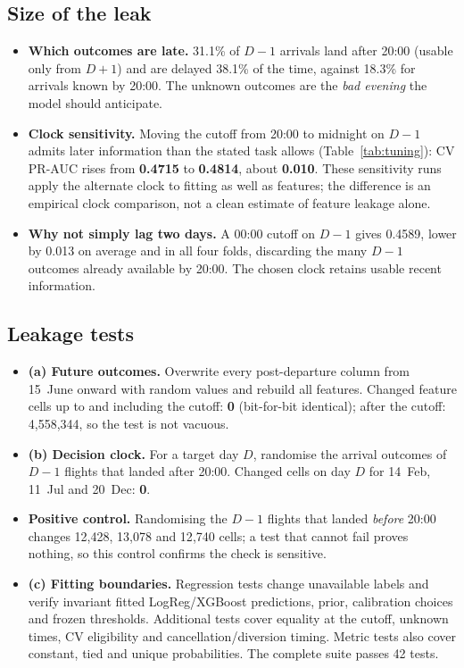 \documentclass[conference]{IEEEtran}
\begin{document}
\subsection{Size of the leak}
\begin{itemize}
\item \textbf{Which outcomes are late.} 31.1\% of $D-1$ arrivals land after 20:00 (usable only from $D+1$) and are delayed 38.1\% of the time, against 18.3\% for arrivals known by 20:00. The unknown outcomes are the \emph{bad evening} the model should anticipate.
\item \textbf{Clock sensitivity.} Moving the cutoff from 20:00 to midnight on $D-1$ admits later information than the stated task allows (Table~\ref{tab:tuning}): CV PR-AUC rises from \textbf{0.4715} to \textbf{0.4814}, about \textbf{0.010}. These sensitivity runs apply the alternate clock to fitting as well as features; the difference is an empirical clock comparison, not a clean estimate of feature leakage alone.
\item \textbf{Why not simply lag two days.} A 00:00 cutoff on $D-1$ gives 0.4589, lower by 0.013 on average and in all four folds, discarding the many $D-1$ outcomes already available by 20:00. The chosen clock retains usable recent information.
\end{itemize}

\subsection{Leakage tests}
\begin{itemize}
\item \textbf{(a) Future outcomes.} Overwrite every post-departure column from 15~June onward with random values and rebuild all features. Changed feature cells up to and including the cutoff: \textbf{0} (bit-for-bit identical); after the cutoff: 4{,}558{,}344, so the test is not vacuous.
\item \textbf{(b) Decision clock.} For a target day $D$, randomise the arrival outcomes of $D-1$ flights that landed after 20:00. Changed cells on day $D$ for 14~Feb, 11~Jul and 20~Dec: \textbf{0}.
\item \textbf{Positive control.} Randomising the $D-1$ flights that landed \emph{before} 20:00 changes 12{,}428, 13{,}078 and 12{,}740 cells; a test that cannot fail proves nothing, so this control confirms the check is sensitive.
\item \textbf{(c) Fitting boundaries.} Regression tests change unavailable labels and verify invariant fitted LogReg/XGBoost predictions, prior, calibration choices and frozen thresholds. Additional tests cover equality at the cutoff, unknown times, CV eligibility and cancellation/diversion timing. Metric tests also cover constant, tied and unique probabilities. The complete suite passes 42 tests.
\end{itemize}
\end{document}
